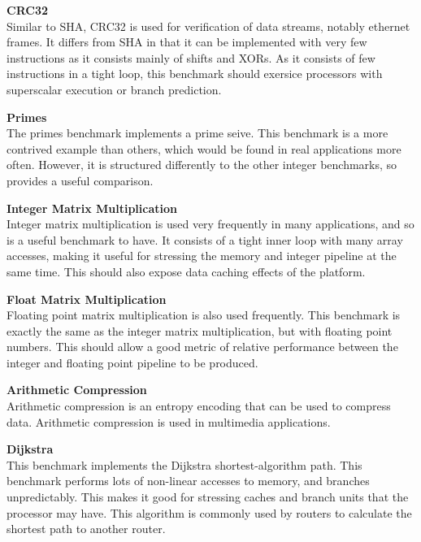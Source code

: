 \documentclass[twocolumn]{article}
\begin{document}
\vspace{3mm}
\textbf{CRC32}\\
Similar to SHA, CRC32 is used for verification of data streams, notably ethernet frames. It differs from SHA in that it can be implemented with very few instructions as it consists mainly of shifts and XORs. As it consists of few instructions in a tight loop, this benchmark should exersice processors with superscalar execution or branch prediction.

\vspace{3mm}
\textbf{Primes}\\
The primes benchmark implements a prime seive. This benchmark is a more contrived example than others, which would be found in real applications more often. However, it is structured differently to the other integer benchmarks, so provides a useful comparison.

\vspace{3mm}
\textbf{Integer Matrix Multiplication}\\
Integer matrix multiplication is used very frequently in many applications, and so is a useful benchmark to have. It consists of a tight inner loop with many array accesses, making it useful for stressing the memory and integer pipeline at the same time. This should also expose data caching effects of the platform.

\vspace{3mm}
\textbf{Float Matrix Multiplication}\\
Floating point matrix multiplication is also used frequently. This benchmark is exactly the same as the integer matrix multiplication, but with floating point numbers. This should allow a good metric of relative performance between the integer and floating point pipeline to be produced.

\vspace{3mm}
\textbf{Arithmetic Compression}\\
Arithmetic compression is an entropy encoding that can be used to compress data. Arithmetic compression is used in multimedia applications.

\vspace{3mm}
\textbf{Dijkstra}\\
This benchmark implements the Dijkstra shortest-algorithm path. This benchmark performs lots of non-linear accesses to memory, and branches unpredictably. This makes it good for stressing caches and branch units that the processor may have. This algorithm is commonly used by routers to calculate the shortest path to another router.
\end{document}
